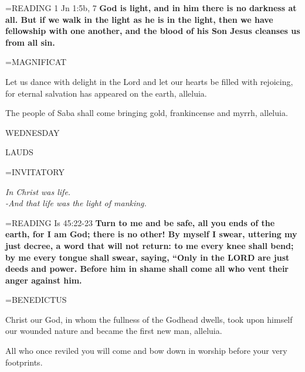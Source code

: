 \hangindent=\parindent \small{\uppercase{READING}}    1 Jn 1:5b, 7 \textbf{   God is light, and in him there is no darkness at all. But if we walk in the light as he is in the light, then we have fellowship with one another, and the blood of his Son Jesus cleanses us from all sin.\\}

\hangindent=\parindent \small MAGNIFICAT
\begin{description}[labelindent=\parindent, leftmargin=*]
\item [(before the Epiphany):]  Let us dance with delight in the Lord and let our hearts be filled with rejoicing, for eternal salvation has appeared on the earth, alleluia.
\item [(Thursday after the Epiphany):]  The people of Saba shall come bringing gold, frankincense and myrrh, alleluia.
\end{description}

\begin{center}
\normalsize WEDNESDAY
\end{center}

\begin{flushleft}\normalsize LAUDS\\\end{flushleft}

\hangindent=\parindent \small{INVITATORY}
\begin{center}
\textit{In Christ was life.\\}
\textit{-And that life was the light of manking.\\}
\end{center}

\hangindent=\parindent \small{\uppercase{READING}}    Is 45:22-23 \textbf{   Turn to me and be safe, all you ends of the earth, for I am God; there is no other! By myself I swear, uttering my just decree, a word that will not return: to me every knee shall bend; by me every tongue shall swear, saying, “Only in the LORD are just deeds and power. Before him in shame shall come all who vent their anger against him.\\}

\hangindent=\parindent \small BENEDICTUS
\begin{description}[labelindent=\parindent, leftmargin=*]
\item [(before the Epiphany):]  Christ our God, in whom the fullness of the Godhead dwells, took upon himself our wounded nature and became the first new man, alleluia.
\item [(Friday after the Epiphany):]  All who once reviled you will come and bow down in worship before your very footprints.
\end{description}


